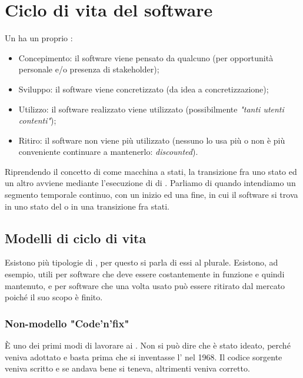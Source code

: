 \documentclass[../main]{subfiles}
\begin{document}
\section{Ciclo di vita del software}
Un  ha un proprio :
\begin{itemize}
    \item Concepimento: il software viene pensato da qualcuno (per opportunità personale e/o presenza di stakeholder);
    \item Sviluppo: il software viene concretizzato (da idea a concretizzazione);
    \item Utilizzo: il software realizzato viene utilizzato (possibilmente \textit{"tanti utenti contenti"});
    \item Ritiro: il software non viene più utilizzato (nessuno lo usa più o non è più conveniente continuare a mantenerlo: \textit{discounted}).
\end{itemize}
Riprendendo il concetto di  come macchina a stati, la transizione fra uno stato ed un altro avviene mediante l'esecuzione di  di .\newline
Parliamo di  quando intendiamo un segmento temporale continuo, con un inizio ed una fine, in cui il software si trova in uno stato del  o in una transizione fra stati.
\subsection{Modelli di ciclo di vita}
Esistono più tipologie di , per questo si parla di essi al plurale. Esistono, ad esempio,  utili per software che deve essere costantemente in funzione e quindi mantenuto, e  per software che una volta usato può essere ritirato dal mercato poiché il suo scopo è finito.
\subsubsection{Non-modello "Code'n'fix"}
È uno dei primi modi di lavorare ai . Non si può dire che è stato ideato, perché veniva adottato e basta prima che si inventasse l' nel 1968. Il codice sorgente veniva scritto e se andava bene si teneva, altrimenti veniva corretto.
\end{document}
